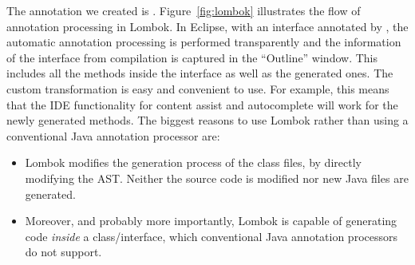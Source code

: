 The annotation we created is \mixin. Figure~\ref{fig:lombok} illustrates the
flow of \mixin annotation processing in Lombok. In Eclipse, with an interface annotated by
\mixin, the automatic annotation processing is performed transparently and the information of
the interface from compilation is captured in the ``Outline'' window. This includes
all the methods inside the interface as well as the generated ones.  The custom
transformation is easy and convenient to use.  For example, this means that the
IDE functionality for content assist and autocomplete will work for the newly generated
methods. The biggest reasons to use Lombok rather than using a conventional Java
 annotation processor are:
\begin{itemize}
\item Lombok modifies the generation process of the class files, by directly modifying the AST.
Neither the source code is modified nor new Java files are generated.
\item Moreover, and probably more importantly, Lombok is capable of generating
  code \emph{inside} a class/interface, which conventional
  Java annotation processors do not support.
\end{itemize}

